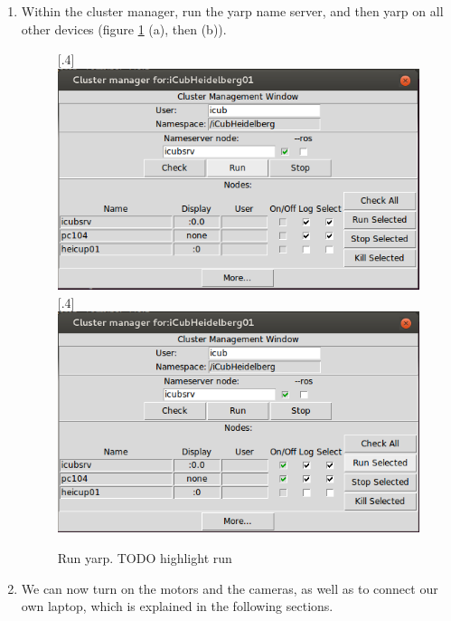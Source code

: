 \begin{enumerate}
	\newline {}
	\item Within the cluster manager, run the yarp name server, and then yarp on all other devices (figure \ref{fig::B1_cluster} (a), then (b)).
	\begin{figure}[h]
		\centering
		[.4\linewidth]{\includegraphics[scale=.3]{chapters/07_appendix/img/ran_yarp.png}}
		[.4\linewidth]{\includegraphics[scale=.3]{chapters/07_appendix/img/ran_yarp_others.png}}
		\caption{Run yarp. TODO highlight run}
		\label{fig::B1_cluster}
	\end{figure}
	\item We can now turn on the motors and the cameras, as well as to connect our own laptop, which is explained in the following sections.
\end{enumerate}

